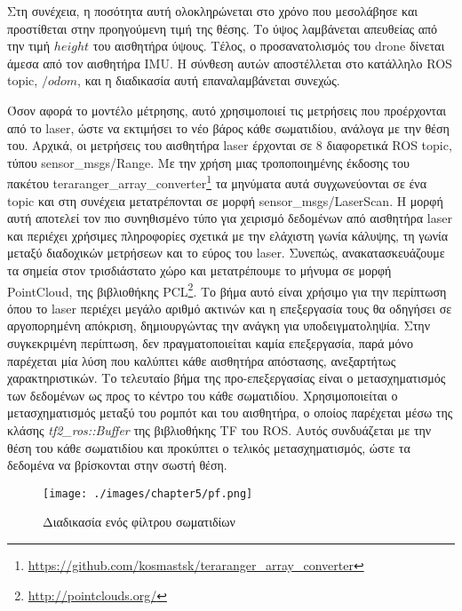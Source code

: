 Στη συνέχεια, η ποσότητα αυτή ολοκληρώνεται στο χρόνο που μεσολάβησε και προστίθεται στην προηγούμενη τιμή της θέσης. Το ύψος λαμβάνεται απευθείας από την τιμή $height$ του αισθητήρα ύψους. Τέλος, ο προσανατολισμός του drone δίνεται άμεσα από τον αισθητήρα IMU. Η σύνθεση αυτών αποστέλλεται στο κατάλληλο ROS topic, $/odom$, και η διαδικασία αυτή επαναλαμβάνεται συνεχώς.

Όσον αφορά το μοντέλο μέτρησης, αυτό χρησιμοποιεί τις μετρήσεις που προέρχονται από το laser, ώστε να εκτιμήσει το νέο βάρος κάθε σωματιδίου, ανάλογα με την θέση του. Αρχικά, οι μετρήσεις του αισθητήρα laser έρχονται σε 8 διαφορετικά ROS topic, τύπου sensor\_msgs/Range. Με την χρήση μιας τροποποιημένης έκδοσης του πακέτου teraranger\_array\_converter\footnote{\href{https://github.com/kosmastsk/teraranger\_array\_converter}{https://github.com/kosmastsk/teraranger\_array\_converter}} τα μηνύματα αυτά συγχωνεύονται σε ένα topic και στη συνέχεια μετατρέπονται σε μορφή sensor\_msgs/LaserScan. Η μορφή αυτή αποτελεί τον πιο συνηθισμένο τύπο για χειρισμό δεδομένων από αισθητήρα laser και περιέχει χρήσιμες πληροφορίες σχετικά με την ελάχιστη γωνία κάλυψης, τη γωνία μεταξύ διαδοχικών μετρήσεων και το εύρος του laser. Συνεπώς, ανακατασκευάζουμε τα σημεία στον τρισδιάστατο χώρο και μετατρέπουμε το μήνυμα σε μορφή PointCloud, της βιβλιοθήκης PCL\footnote{\href{http://pointclouds.org/}{http://pointclouds.org/}}. Το βήμα αυτό είναι χρήσιμο για την περίπτωση όπου το laser περιέχει μεγάλο αριθμό ακτινών και η επεξεργασία τους θα οδηγήσει σε αργοπορημένη απόκριση, δημιουργώντας την ανάγκη για υποδειγματοληψία. Στην συγκεκριμένη περίπτωση, δεν πραγματοποιείται καμία επεξεργασία, παρά μόνο παρέχεται μία λύση που καλύπτει κάθε αισθητήρα απόστασης, ανεξαρτήτως χαρακτηριστικών. Το τελευταίο βήμα της προ-επεξεργασίας είναι ο μετασχηματισμός των δεδομένων ως προς το κέντρο του κάθε σωματιδίου. Χρησιμοποιείται ο μετασχηματισμός μεταξύ του ρομπότ και του αισθητήρα, ο οποίος παρέχεται μέσω της κλάσης \emph{tf2\_ros::Buffer} της βιβλιοθήκης TF του ROS. Αυτός συνδυάζεται με την θέση του κάθε σωματιδίου και προκύπτει ο τελικός μετασχηματισμός, ώστε τα δεδομένα να βρίσκονται στην σωστή θέση.

\begin{figure}[!ht]
    \centering
    \texttt{[image: ./images/chapter5/pf.png]}
        \caption{Διαδικασία ενός φίλτρου σωματιδίων} 
    \label{fig:pf}
\end{figure}

